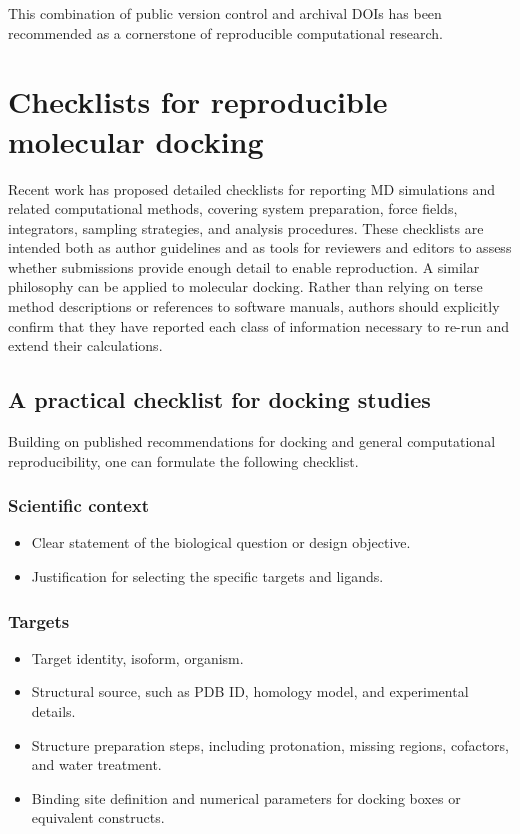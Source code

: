 \documentclass[12pt]{article}
\begin{document}
This combination of public version control and archival DOIs has been recommended as a cornerstone of reproducible computational research\cite{CH12_toolsRepro2016,CH12_gitRepro2013,CH12_barba2022role}.

\section{Checklists for reproducible molecular docking}

Recent work has proposed detailed checklists for reporting MD simulations and related computational methods, covering system preparation, force fields, integrators, sampling strategies, and analysis procedures\cite{CH12_mdChecklist2023}. These checklists are intended both as author guidelines and as tools for reviewers and editors to assess whether submissions provide enough detail to enable reproduction. A similar philosophy can be applied to molecular docking. Rather than relying on terse method descriptions or references to software manuals, authors should explicitly confirm that they have reported each class of information necessary to re-run and extend their calculations\cite{CH12_plos2025tenDocking}.

\subsection{A practical checklist for docking studies}

Building on published recommendations for docking\cite{CH12_plos2025tenDocking} and general computational reproducibility, one can formulate the following checklist.

\subsubsection{Scientific context}

\begin{itemize}
  \item Clear statement of the biological question or design objective.
  \item Justification for selecting the specific targets and ligands.
\end{itemize}

\subsubsection{Targets}

\begin{itemize}
  \item Target identity, isoform, organism.
  \item Structural source, such as PDB ID, homology model, and experimental details.
  \item Structure preparation steps, including protonation, missing regions, cofactors, and water treatment.
  \item Binding site definition and numerical parameters for docking boxes or equivalent constructs.
\end{itemize}
\end{document}
